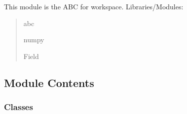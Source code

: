 \documentclass[letterpaper,10pt,english]{sphinxmanual}
\begin{document}
\begin{fulllineitems}

\begin{fulllineitems}
\label{\detokenize{autoapi/NS_Airfoil/index:NS_Airfoil.NS_Airfoil.__set_porosity}}
\end{fulllineitems}


\end{fulllineitems}



\section{}
\label{\detokenize{autoapi/Workspace/index:module-Workspace}}\label{\detokenize{autoapi/Workspace/index:workspace}}\label{\detokenize{autoapi/Workspace/index::doc}}
\sphinxAtStartPar
This module is the ABC for workspace.
Libraries/Modules:
\begin{quote}

\sphinxAtStartPar
abc

\sphinxAtStartPar
numpy

\sphinxAtStartPar
Field
\end{quote}


\subsection{Module Contents}
\label{\detokenize{autoapi/Workspace/index:module-contents}}

\subsubsection{Classes}
\label{\detokenize{autoapi/Workspace/index:classes}}
\end{document}
